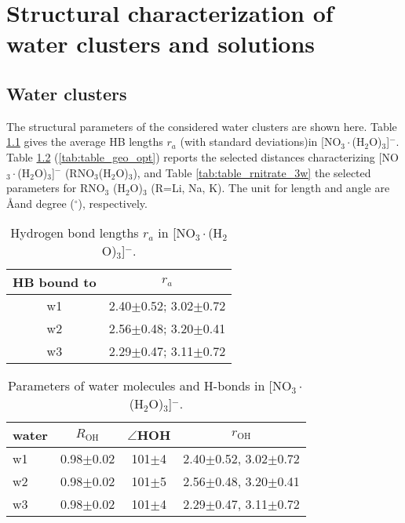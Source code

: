 \chapter{Structural characterization of water clusters and solutions}
\section{Water clusters}\label{structure_of_clusters}
The structural parameters of the considered water clusters are shown here.
Table \ref{tab:3_nitrate_bond_0} gives the average HB lengths $r_a$ (with standard deviations)in [NO$_3\cdot$(H$_2$O)$_3$]$^-$.  
Table \ref{tab:3w_nitrate} (\ref{tab:table_geo_opt}) reports the selected distances characterizing 
[NO$_3\cdot$(H$_2$O)$_3$]$^-$ (RNO$_3$(H$_2$O)$_3$), and Table \ref{tab:table_rnitrate_3w} the selected parameters for RNO$_3$   
 (H$_2$O)$_3$ (R=Li, Na, K).
The unit for length and angle are \AA and degree ($^\circ$), respectively.
% 
\begin{table}[!h]
\centering
\caption{\label{tab:3_nitrate_bond_0}%
Hydrogen bond lengths $r_a$ in [NO$_3\cdot$(H$_2$O)$_3$]$^-$.} %
\begin{tabular}{cc} \\\toprule
 HB bound to & \multicolumn{1}{c}{ $r_a$} \\
\hline
 w1 &2.40$\pm$0.52; 3.02$\pm$0.72 \\
 w2 &2.56$\pm$0.48; 3.20$\pm$0.41 \\
 w3 &2.29$\pm$0.47; 3.11$\pm$0.72
\end{tabular}
\end{table}
%
\begin{table}[!htbp]
\centering
\caption{\label{tab:3w_nitrate}%
Parameters of water molecules and H-bonds in [NO$_3\cdot$(H$_2$O)$_3$]$^-$.} %
\begin{tabular}{lccc}
water &$R_\text{OH}$ &$\angle$HOH & $r_\text{OH}$ \\
\hline
w1 &0.98$\pm$0.02 &101$\pm$4 & 2.40$\pm$0.52, 3.02$\pm$0.72 \\
w2 &0.98$\pm$0.02 &101$\pm$5 & 2.56$\pm$0.48, 3.20$\pm$0.41 \\
w3 &0.98$\pm$0.02 &101$\pm$4 & 2.29$\pm$0.47, 3.11$\pm$0.72
\end{tabular}
\end{table}
%
